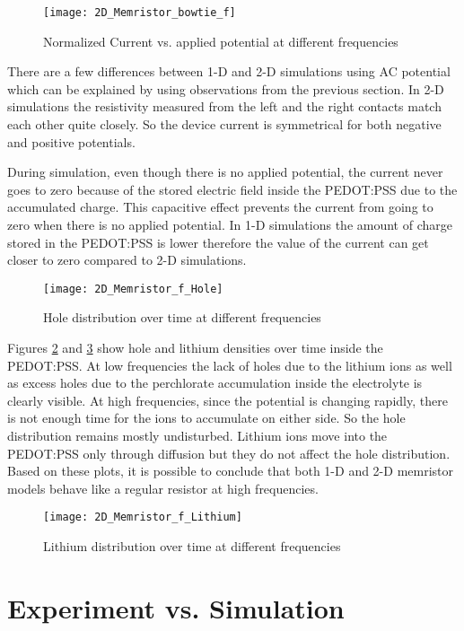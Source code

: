 \begin{doublespace}
\begin{figure}[!htp]
\centering
\texttt{[image: 2D\_Memristor\_bowtie\_f]}
\caption{Normalized Current vs. applied potential at different frequencies} 
\label{1dIV}
\end{figure}

There are a few differences between 1-D and 2-D simulations using AC potential which can be explained by using observations from the previous section. In 2-D simulations the resistivity measured from the left and the right contacts match each other quite closely. So the device current is symmetrical for both negative and positive potentials. 

During simulation, even though there is no applied potential, the current never goes to zero because of the stored electric field inside the PEDOT:PSS due to the accumulated charge. This capacitive effect prevents the current from going to zero when there is no applied potential. In 1-D simulations the amount of charge stored in the PEDOT:PSS is lower therefore the value of the current can get closer to zero compared to 2-D simulations.  

\begin{figure}[!htp]
\centering
\texttt{[image: 2D\_Memristor\_f\_Hole]}
\caption{Hole distribution over time at different frequencies} 
\label{fhole}
\end{figure}

Figures \ref{fhole} and \ref{flit} show hole and lithium densities over time inside the PEDOT:PSS. At low frequencies the lack of holes due to the lithium ions as well as excess holes due to the perchlorate accumulation inside the electrolyte is clearly visible. At high frequencies, since the potential is changing rapidly, there is not enough time for the ions to accumulate on either side. So the hole distribution remains mostly undisturbed. Lithium ions move into the PEDOT:PSS only through diffusion but they do not affect the hole distribution. Based on these plots, it is possible to conclude that both 1-D and 2-D memristor models behave like a regular resistor at high frequencies. 


\begin{figure}[!htp]
\centering
\texttt{[image: 2D\_Memristor\_f\_Lithium]}
\caption{Lithium distribution over time at different frequencies} 
\label{flit}
\end{figure}


\clearpage
\section{Experiment vs. Simulation}


\end{doublespace}
